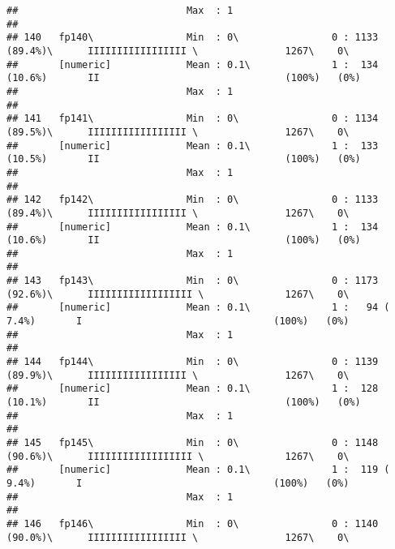 \documentclass[]{article}
\begin{document}
\begin{verbatim}
##                             Max  : 1                                                                                            
## 
## 140   fp140\                Min  : 0\                0 : 1133 (89.4%)\      IIIIIIIIIIIIIIIII \               1267\    0\       
##       [numeric]             Mean : 0.1\              1 :  134 (10.6%)       II                                (100%)   (0%)     
##                             Max  : 1                                                                                            
## 
## 141   fp141\                Min  : 0\                0 : 1134 (89.5%)\      IIIIIIIIIIIIIIIII \               1267\    0\       
##       [numeric]             Mean : 0.1\              1 :  133 (10.5%)       II                                (100%)   (0%)     
##                             Max  : 1                                                                                            
## 
## 142   fp142\                Min  : 0\                0 : 1133 (89.4%)\      IIIIIIIIIIIIIIIII \               1267\    0\       
##       [numeric]             Mean : 0.1\              1 :  134 (10.6%)       II                                (100%)   (0%)     
##                             Max  : 1                                                                                            
## 
## 143   fp143\                Min  : 0\                0 : 1173 (92.6%)\      IIIIIIIIIIIIIIIIII \              1267\    0\       
##       [numeric]             Mean : 0.1\              1 :   94 ( 7.4%)       I                                 (100%)   (0%)     
##                             Max  : 1                                                                                            
## 
## 144   fp144\                Min  : 0\                0 : 1139 (89.9%)\      IIIIIIIIIIIIIIIII \               1267\    0\       
##       [numeric]             Mean : 0.1\              1 :  128 (10.1%)       II                                (100%)   (0%)     
##                             Max  : 1                                                                                            
## 
## 145   fp145\                Min  : 0\                0 : 1148 (90.6%)\      IIIIIIIIIIIIIIIIII \              1267\    0\       
##       [numeric]             Mean : 0.1\              1 :  119 ( 9.4%)       I                                 (100%)   (0%)     
##                             Max  : 1                                                                                            
## 
## 146   fp146\                Min  : 0\                0 : 1140 (90.0%)\      IIIIIIIIIIIIIIIII \               1267\    0\       

\end{verbatim}
\end{document}
